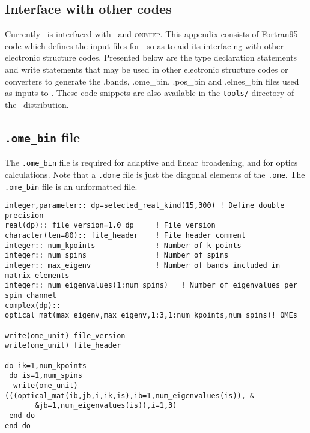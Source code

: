 \documentclass[a4paper,11pt,twoside]{book}
\begin{document}
\begin{appendix}

\chapter{Interface with other codes}
Currently \optados\ is interfaced with \castep\ and \textsc{onetep}.
%
This appendix consists of Fortran95 code which defines the input files for \optados\ so as to aid its interfacing with other electronic structure codes.
%
Presented below are the type declaration statements and write statements that may be used in other electronic structure codes or converters to generate the .bands, .ome\_bin, .pos\_bin and .elnes\_bin files used as inputs to \optados.
%
These code snippets are also available in the \texttt{tools/} directory of the \optados\ distribution.

\section{\texttt{.ome\_bin} file}
The \texttt{.ome\_bin} file is required for adaptive and linear broadening, and for optics calculations. 
%
Note that a \texttt{.dome} file is just the diagonal elements of the \texttt{.ome}.
%
The \texttt{.ome\_bin} file is an unformatted file.
\begin{verbatim}
integer,parameter:: dp=selected_real_kind(15,300) ! Define double precision
real(dp):: file_version=1.0_dp     ! File version
character(len=80):: file_header    ! File header comment
integer:: num_kpoints              ! Number of k-points
integer:: num_spins                ! Number of spins
integer:: max_eigenv               ! Number of bands included in matrix elements
integer:: num_eigenvalues(1:num_spins)   ! Number of eigenvalues per spin channel
complex(dp):: optical_mat(max_eigenv,max_eigenv,1:3,1:num_kpoints,num_spins)! OMEs

write(ome_unit) file_version
write(ome_unit) file_header

do ik=1,num_kpoints
 do is=1,num_spins
  write(ome_unit) (((optical_mat(ib,jb,i,ik,is),ib=1,num_eigenvalues(is)), &
       &jb=1,num_eigenvalues(is)),i=1,3)
 end do
end do
\end{verbatim}


\end{appendix}
\end{document}
